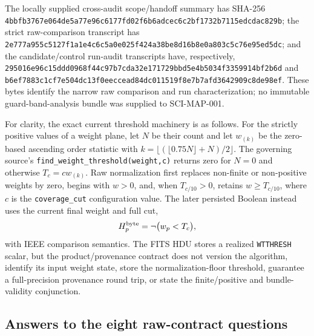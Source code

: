 \documentclass[11pt]{article}
\newcommand{\code}[1]{\nolinkurl{#1}}
\newcommand{\digest}[8]{\texttt{#1\allowbreak#2\allowbreak#3\allowbreak#4\allowbreak#5\allowbreak#6\allowbreak#7\allowbreak#8}}
\begin{document}
{\raggedright The locally supplied cross-audit scope/handoff summary has SHA-256
\digest{4bbfb376}{7e064de5}{a77e96c6}{177fd02f}{6b6adcec}{6c2bf173}{2b7115ed}{cdac829b};
the strict raw-comparison transcript has
\digest{2e777a95}{5c5127f1}{a1e4c6c5}{a0e025f4}{24a38be8}{d16b8e0a}{803c5c76}{e95ed5dc};
and the candidate/control run-audit transcripts have, respectively,
\digest{295016e9}{6c15ddd0}{968f44c9}{7b7cda32}{e171729b}{bd5e4b50}{34f33599}{14bf2b6d}
and
\digest{b6ef7883}{c1cf7e50}{4dc13f0e}{eccead84}{dc011519}{f8e7b7af}{d3642909}{c8de98ef}.
These bytes identify the narrow raw comparison and run characterization; no
immutable guard-band-analysis bundle was supplied to SCI-MAP-001.\par}

For clarity, the exact current threshold machinery is as follows.  For the
strictly positive values of a weight plane, let \(N\) be their count and let
\(w_{(k)}\) be the zero-based ascending order statistic with
\(k=\lfloor(\lfloor0.75N\rfloor+N)/2\rfloor\).  The governing source's
\code{find_weight_threshold(weight,c)} returns zero for \(N=0\) and otherwise
\(T_c=cw_{(k)}\).  Raw normalization first replaces non-finite or non-positive
weights by zero, begins with \(w>0\), and, when
\(T_{c/10}>0\), retains \(w\ge T_{c/10}\), where \(c\) is the
\code{coverage_cut} configuration value.  The later persisted Boolean instead uses the
current final weight and full cut,
\begin{equation}
 H^{\rm byte}_p=\neg\bigl(w_p<T_c\bigr),
 \label{eq:audit-current-coverage-bool}
\end{equation}
with IEEE comparison semantics.  The FITS HDU stores a realized
\code{WTTHRESH} scalar, but the product/provenance contract does not version
the algorithm, identify its input weight state, store the normalization-floor
threshold, guarantee a full-precision provenance round trip, or state the
finite/positive and bundle-validity conjunction.

\subsection{Answers to the eight raw-contract questions}
\end{document}
